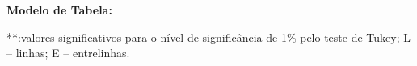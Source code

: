 \newpage
\noindent\textbf{Modelo de Tabela:}

\begin{table}[ht]
\caption{Análise do IC nas linhas (L) e entrelinhas (E) de cana nas diferentes profundidades amostradas pelo índice de cone.}
\vspace{.2cm}
\centering
{}
\small{**:valores significativos para o nível de significância de 1\% pelo teste de Tukey; L – linhas; E – entrelinhas.}
\label{tab:nome_tabela1}
\end{table}